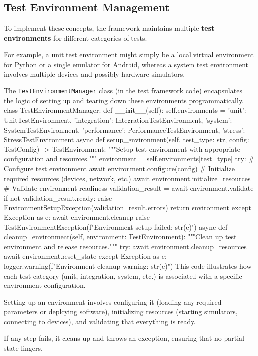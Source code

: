 {{\subsection{Test Environment Management}

To implement these concepts, the framework maintains multiple \textbf{test environments}
 for different categories of tests.

For example, a unit test environment might simply be a local virtual environment
for Python or a single emulator for Android, whereas a system test environment
involves multiple devices and possibly hardware simulators.

The \texttt{TestEnvironmentManager} class (in the test framework code)
encapsulates the logic of setting up and tearing down these environments
programmatically. class TestEnvironmentManager: def _\_init__(self):
self.environments = { 'unit': UnitTestEnvironment, 'integration':
IntegrationTestEnvironment, 'system': SystemTestEnvironment, 'performance':
PerformanceTestEnvironment, 'stress': StressTestEnvironment } async def
setup\_environment(self, test\_type: str, config: TestConfig) ->
TestEnvironment: """Setup test environment with appropriate configuration and
resources.""" environment = self.environments[test\_type] try: # Configure test
environment await environment.configure(config) # Initialize required resources
(devices, network, etc.) await environment.initialize\_resources # Validate
environment readiness validation\_result = await environment.validate if not
validation\_result.ready: raise
EnvironmentSetupException(validation\_result.errors) return environment except
Exception as e: await environment.cleanup raise
TestEnvironmentException(f"Environment setup failed: {str(e)}") async def
cleanup\_environment(self, environment: TestEnvironment): """Clean up test
environment and release resources.""" try: await environment.cleanup\_resources
await environment.reset\_state except Exception as e:
logger.warning(f"Environment cleanup warning: {str(e)}") This code illustrates
how each test category (unit, integration, system, etc.) is associated with a
specific environment configuration.

Setting up an environment involves configuring it (loading any required
parameters or deploying software), initializing resources (starting simulators,
connecting to devices), and validating that everything is ready.

If any step fails, it cleans up and throws an exception, ensuring that no
partial state lingers.

}}

